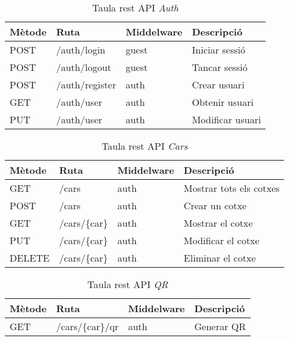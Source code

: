 \begin{slide}
    \begin{table}[H]
    \centering
    \begin{tabular}{llll}
        \hline
        \textbf{Mètode} & \textbf{Ruta} & \textbf{Middelware} & \textbf{Descripció} \\ \hline
        POST            & /auth/login     & guest &  Iniciar sessió     \\ \hline
        POST            & /auth/logout    & guest &  Tancar sessió     \\ \hline
        POST            & /auth/register  & auth  &  Crear usuari    \\ \hline
        GET             & /auth/user      & auth  &  Obtenir usuari    \\ \hline
        PUT             & /auth/user      & auth  &  Modificar usuari  \\ \hline
        \end{tabular}
    \caption{Taula rest API \emph{Auth}}
    \end{table}
\end{slide}

\begin{slide}
    \begin{table}[H]
    \centering
    \begin{tabular}{llll}
    \hline
    \textbf{Mètode} & \textbf{Ruta} & \textbf{Middelware} & \textbf{Descripció} \\ \hline
        GET             & /cars       & auth &  Mostrar tots els cotxes     \\ \hline
        POST            & /cars        & auth & Crear un cotxe     \\ \hline
        GET             & /cars/\{car\}  & auth & Mostrar el cotxe     \\ \hline
        PUT             & /cars/\{car\}  & auth & Modificar el cotxe     \\ \hline
        DELETE          & /cars/\{car\}  & auth & Eliminar el cotxe     \\ \hline
        \end{tabular}
    \caption{Taula rest API \emph{Cars}}
    \end{table}
\end{slide}

\begin{slide}
    \begin{table}[H]
        \centering
        \begin{tabular}{llll}
        \hline
        \textbf{Mètode} & \textbf{Ruta} & \textbf{Middelware} & \textbf{Descripció} \\ \hline
        GET             & /cars/\{car\}/qr   &  auth  & Generar QR  \\ \hline
        \end{tabular}
        \caption{Taula rest API \emph{QR}}
    \end{table}
\end{slide}

